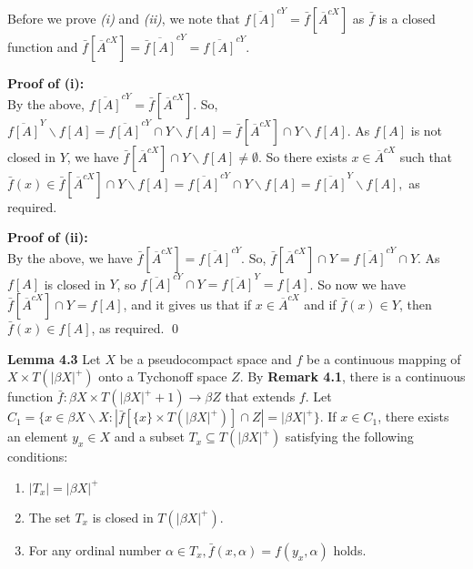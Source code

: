\documentclass{article}
\begin{document}
																					      \vskip 20pt
																					      Before we prove \emph{(i)} and \emph{(ii)}, we note that $\overline{f[A]}^{cY} = \bar{f}\left[\overline{A}^{cX}\right]$ as $\bar{f}$ is a closed function and $\bar{f}\left[\overline{A}^{cX}\right]=\overline{\bar{f}[A]}^{cY}=\overline{f[A]}^{cY}$. 

																					      \vskip 20pt

																					      \textbf{Proof of (i): }\\ 
																					      By the above,  $\overline{f[A]}^{cY} = \bar{f}\left[\overline{A}^{cX}\right]$. So, $\overline{f[A]}^Y\backslash f[A]=\overline{f[A]}^{cY}\cap Y \backslash f[A] = \bar{f}\left[\overline{A}^{cX}\right] \cap Y \backslash f[A].$ \vskip 10pt
																					      As $f[A]$ is not closed in $Y$, we have $\bar{f}\left[\overline{A}^{cX}\right]\cap Y\backslash f[A]\neq \emptyset$. So there exists $x\in \overline{A}^{cX}$ such that $\bar{f}(x)\in \bar{f}\left[\overline{A}^{cX}\right]\cap Y\backslash f[A]=\overline{f[A]}^{cY}\cap Y \backslash f[A]=\overline{f[A]}^Y\backslash f[A],$ as required.



																					      \vskip 25pt

																					      \textbf{Proof of (ii): }\\By the above, we have $\bar{f}\left[\overline{A}^{cX}\right] = \overline{f[A]}^{cY}$. So,  $\bar{f}\left[\overline{A}^{cX}\right]\cap Y = \overline{f[A]}^{cY} \cap Y$. As $f[A]$ is closed in $Y$, so  $\overline{f[A]}^{cY} \cap Y=\overline{f[A]}^Y=f[A]$. 
																					      So now we have $\bar{f}\left[\overline{A}^{cX}\right]\cap Y= f[A]$, and it gives us that if $x \in  \overline{A}^{cX} $ and if $\bar{f}(x) \in Y$, then $\bar{f}(x) \in f[A]$, as required. \qed




																					      \vskip 40pt



																					      \textbf{Lemma 4.3} Let $X$ be a pseudocompact space and $f$ be a continuous mapping of $X\times T(|\beta X|^+) $
																					      onto a Tychonoff space $Z$. By \textbf{Remark 4.1}, there is a continuous function $\bar{f}: \beta X \times T(|\beta X|^+ +1) \rightarrow \beta Z$ that extends $f$. Let $C_1=\{x\in  \beta X \backslash X: |\bar{f}[\{x\} \times T(|\beta X|^+)] \cap Z|=|\beta X|^+\}$.
																					      If $x\in C_1$, there exists an element $y_x \in X$ and a subset $T_x \subseteq T(|\beta X|^+)$ satisfying the following conditions: 
																					      \begin{enumerate}
																					      \item $|T_x|=|\beta X|^+$
																					      \item The set $T_x$ is closed in $T(|\beta X|^+).$
																					      \item For any ordinal number $\alpha \in T_x, \bar{f} (x,\alpha)=f(y_x,\alpha)$ holds.
																					      \end{enumerate}
\end{document}
